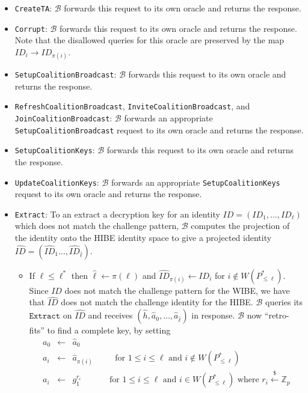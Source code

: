 \documentclass[10pt]{llncs}
\newcommand{\B}{\mathcal{B}}
\newcommand{\ID}{\mathit{ID}}
\newcommand{\getsr}{\stackrel{{\scriptscriptstyle\$}}{\gets}}
\begin{document}
\begin{enumerate}
\begin{itemize}
	\item \texttt{CreateTA}: $\B$ forwards this request to its own oracle and returns the response.
	\item \texttt{Corrupt}: $\B$ forwards this request to its own oracle and returns the response. Note that the disallowed queries for this oracle are preserved by the map $\ID_i \rightarrow \ID_{\pi(i)}$.
	\item \texttt{SetupCoalitionBroadcast}: $\B$ forwards this request to its own oracle and returns the response.
	\item \texttt{RefreshCoalitionBroadcast}, \texttt{InviteCoalitionBroadcast}, and \texttt{JoinCoalitionBroadcast}: $\B$  forwards an appropriate \texttt{SetupCoalitionBroadcast} request to its own oracle and returns the response.
	\item \texttt{SetupCoalitionKeys}: $\B$ forwards this request to its own oracle and returns the response.
	\item \texttt{UpdateCoalitionKeys}: $\B$ forwards an appropriate \texttt{SetupCoalitionKeys} request to its own oracle and returns the response.
	\item \texttt{Extract}: To an extract a decryption key for an identity $\ID=(\ID_{1},\ldots,\ID_{\ell})$ which does not match the challenge pattern, $\B$ computes the projection of the identity onto the HIBE identity space to give a projected identity $\hat{\ID}=(\hat{\ID}_{1}\ldots, \hat{\ID}_{\hat{\ell}})$.
		\begin{itemize}
		\item If $\ell \leq \ell^{*}$ then $\hat{\ell} \gets \pi(\ell)$ and $\hat{\ID}_{\pi(i)} \gets \ID_{i}$ for $i\notin W(P^{*}_{\leq \ell})$. Since $\ID$ does not match the challenge pattern for the WIBE, we have that $\hat{\ID}$ does not match the challenge identity for the HIBE. $\B$ queries its $\texttt{Extract}$ on $\hat{\ID}$ and receives $(\hat{h},\hat{a}_{0},\ldots,\hat{a}_{\hat{\ell}})$ in response. $\B$ now ``retro-fits'' to find a complete key, by setting
			\begin{displaymath}
			\begin{array}{rcl}
			a_{0} &\gets& \hat{a}_{0}\\
			a_{i} &\gets& \hat{a}_{\pi(i)} \qquad \;\mbox{ for }1\leq i\leq \ell \mbox{ and } i\notin W(P^{*}_{\leq \ell})\\
			a_{i} &\gets& g_{1}^{r_{i}} \qquad \quad \mbox{ for }1\leq i\leq \ell \mbox{ and } i\in W(P^{*}_{\leq \ell})\mbox{ where } r_{i}\getsr \mathbb{Z}_{p}\\

\end{array}
\end{displaymath}
\end{itemize}
\end{itemize}
\end{enumerate}
\end{document}

